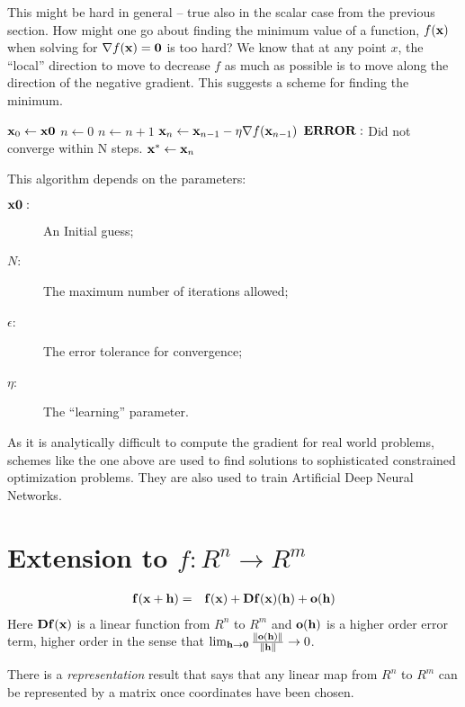 \documentclass{article}
\begin{document}
This might be hard in general -- true also in the scalar case from the previous
section.
How might one go about finding the minimum value of a function, $f({\bf x})$
when solving for $\nabla f({\bf x}) = {\bf 0}$ is too hard?
We know that at any point $x$, the ``local''{} direction to move to decrease $f$
as much as possible is to move along the direction of the negative gradient.
This suggests a scheme for finding the minimum.
\begin{algorithmic}
  \STATE ${\bf x}_0 \leftarrow {\bf x0}$
  \STATE $n \leftarrow 0$
    \STATE $n \leftarrow n + 1$
    \STATE ${\bf x}_n \leftarrow {\bf x}_{n-1} - \eta \nabla f({\bf x}_{n-1})$
  \ENDWHILE
    \vspace{1em}
    \STATE ${\bf ERROR:}$ Did not converge within N steps.
  \ELSE
    \STATE ${\bf x}^* \leftarrow {\bf x}_n$
  \ENDIF
\end{algorithmic}

This algorithm depends on the parameters: 
\begin{description}
    \item[${\bf x0:}$]{An Initial guess;}
    \item[$N$:]{The maximum number of iterations allowed;}
    \item[$\epsilon$:]{The error tolerance for convergence;} 
    \item[$\eta$:]{The ``learning''{} parameter.}
\end{description}
As it is analytically difficult to compute the gradient for real world problems, 
schemes like the one above are used 
to find solutions to sophisticated constrained optimization problems.
They are also used to train Artificial Deep Neural Networks.


\section{Extension to $f:R^n \rightarrow R^m$}
\begin{eqnarray}
  {\bf f}({\bf x} + {\bf h}) & = & {\bf f}({\bf x}) + {\bf Df}({\bf x})({\bf h})
  + {\bf o}({\bf h}) \label{mderdef}
\end{eqnarray}
Here ${\bf Df}({\bf x})$ is a linear function from $R^n$ to $R^m$ and
${\bf o}({\bf h})$ is a higher order error term, higher order in the sense that
$\lim_{{\bf h} \rightarrow {\bf 0}}\frac{\|{\bf o}({\bf h})\|}{\|{\bf h}\|} \rightarrow 0$.

There is a {\em representation\/} result that says that any linear map from $R^n$ to $R^m$ can
be represented by a matrix once coordinates have been chosen.
\end{document}
